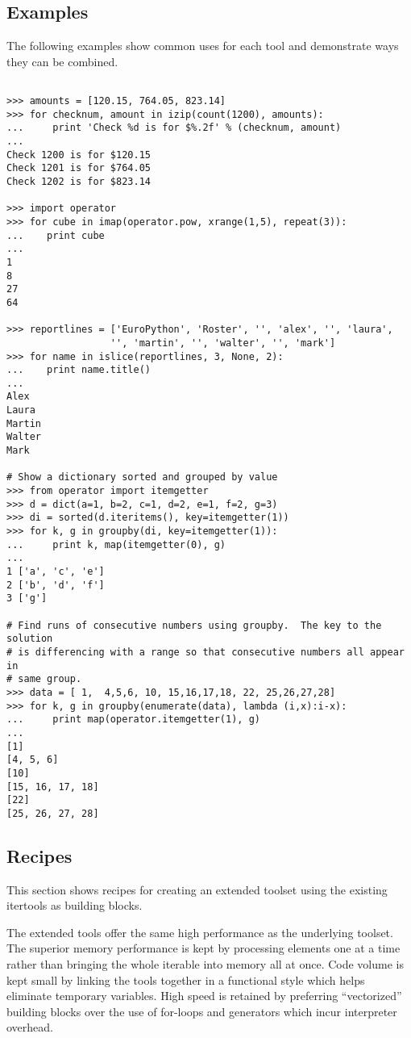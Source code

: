 \subsection{Examples \label{itertools-example}}

The following examples show common uses for each tool and
demonstrate ways they can be combined.

\begin{verbatim}

>>> amounts = [120.15, 764.05, 823.14]
>>> for checknum, amount in izip(count(1200), amounts):
...     print 'Check %d is for $%.2f' % (checknum, amount)
...
Check 1200 is for $120.15
Check 1201 is for $764.05
Check 1202 is for $823.14

>>> import operator
>>> for cube in imap(operator.pow, xrange(1,5), repeat(3)):
...    print cube
...
1
8
27
64

>>> reportlines = ['EuroPython', 'Roster', '', 'alex', '', 'laura',
                  '', 'martin', '', 'walter', '', 'mark']
>>> for name in islice(reportlines, 3, None, 2):
...    print name.title()
...
Alex
Laura
Martin
Walter
Mark

# Show a dictionary sorted and grouped by value
>>> from operator import itemgetter
>>> d = dict(a=1, b=2, c=1, d=2, e=1, f=2, g=3)
>>> di = sorted(d.iteritems(), key=itemgetter(1))
>>> for k, g in groupby(di, key=itemgetter(1)):
...     print k, map(itemgetter(0), g)
...
1 ['a', 'c', 'e']
2 ['b', 'd', 'f']
3 ['g']

# Find runs of consecutive numbers using groupby.  The key to the solution
# is differencing with a range so that consecutive numbers all appear in
# same group.
>>> data = [ 1,  4,5,6, 10, 15,16,17,18, 22, 25,26,27,28]
>>> for k, g in groupby(enumerate(data), lambda (i,x):i-x):
...     print map(operator.itemgetter(1), g)
... 
[1]
[4, 5, 6]
[10]
[15, 16, 17, 18]
[22]
[25, 26, 27, 28]

\end{verbatim}


\subsection{Recipes \label{itertools-recipes}}

This section shows recipes for creating an extended toolset using the
existing itertools as building blocks.

The extended tools offer the same high performance as the underlying
toolset.  The superior memory performance is kept by processing elements one
at a time rather than bringing the whole iterable into memory all at once.
Code volume is kept small by linking the tools together in a functional style
which helps eliminate temporary variables.  High speed is retained by
preferring ``vectorized'' building blocks over the use of for-loops and
generators which incur interpreter overhead.


